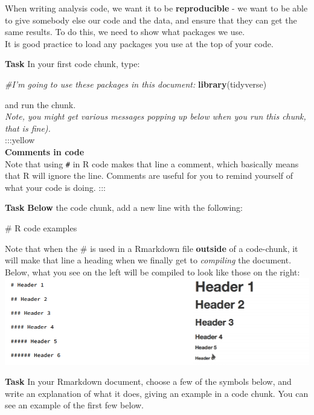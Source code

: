 \documentclass[]{book}
\newenvironment{Shaded}{\begin{snugshade}}{\end{snugshade}}
\newcommand{\CommentTok}[1]{\textcolor[rgb]{0.56,0.35,0.01}{\textit{#1}}}
\newcommand{\KeywordTok}[1]{\textcolor[rgb]{0.13,0.29,0.53}{\textbf{#1}}}
\newcommand{\NormalTok}[1]{#1}
\begin{document}
When writing analysis code, we want it to be \textbf{reproducible} - we want to be able to give somebody else our code and the data, and ensure that they can get the same results. To do this, we need to show what packages we use.\\
It is good practice to load any packages you use at the top of your code.

\textbf{Task}
In your first code chunk, type:

\begin{Shaded}
\begin{Highlighting}[]
\CommentTok{#I'm going to use these packages in this document:}
\KeywordTok{library}\NormalTok{(tidyverse)}
\end{Highlighting}
\end{Shaded}

and run the chunk.\\
\emph{Note, you might get various messages popping up below when you run this chunk, that is fine).}\\
:::yellow\\
\textbf{Comments in code}\\
Note that using \texttt{\#} in R code makes that line a comment, which basically means that R will ignore the line. Comments are useful for you to remind yourself of what your code is doing.
:::

\textbf{Task}
\textbf{Below} the code chunk, add a new line with the following:

\# R code examples

Note that when the \# is used in a Rmarkdown file \textbf{outside} of a code-chunk, it will make that line a heading when we finally get to \emph{compiling} the document. Below, what you see on the left will be compiled to look like those on the right:\\
\includegraphics{images/installing_intro/headings.png}

\textbf{Task}
In your Rmarkdown document, choose a few of the symbols below, and write an explanation of what it does, giving an example in a code chunk. You can see an example of the first few below.
\end{document}
